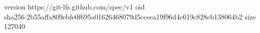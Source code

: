 version https://git-lfs.github.com/spec/v1
oid sha256:2b55affa809ebfe0f695a01626468079d5cceea19f96d4c619c828eb138064b2
size 127040
